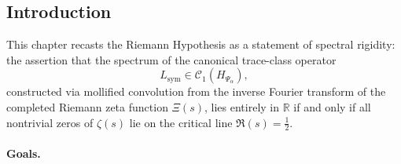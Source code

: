 \subsection*{Introduction}

This chapter recasts the Riemann Hypothesis as a statement of spectral rigidity: the assertion that the spectrum of the canonical trace-class operator
\[
L_{\mathrm{sym}} \in \mathcal{C}_1(H_{\Psi_\alpha}),
\]
constructed via mollified convolution from the inverse Fourier transform of the completed Riemann zeta function \( \Xi(s) \), lies entirely in \( \mathbb{R} \) if and only if all nontrivial zeros of \( \zeta(s) \) lie on the critical line \( \Re(s) = \tfrac{1}{2} \).

\paragraph{Goals.}
